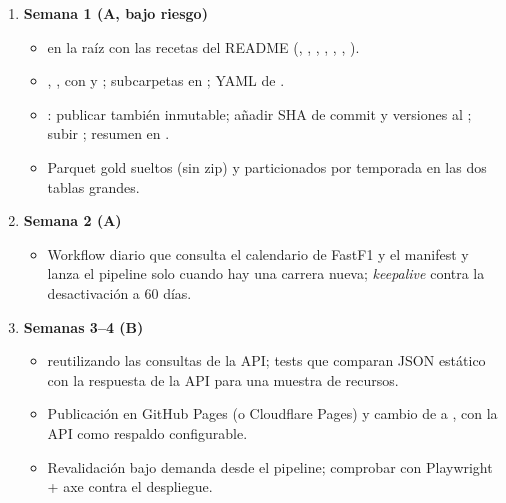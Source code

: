 \begin{enumerate}
\item \textbf{Semana 1 (A, bajo riesgo)}
\begin{itemize}
\item {} en la raíz con las recetas del README (, , , , , , ).
\item {}, ,  con  y ; subcarpetas en ; YAML de .
\item {}: publicar también  inmutable; añadir SHA de commit y versiones al ; subir ; resumen en .
\item Parquet gold sueltos (sin zip) y particionados por temporada en las dos tablas grandes.
\end{itemize}
\item \textbf{Semana 2 (A)}
\begin{itemize}
\item Workflow  diario que consulta el calendario de FastF1 y el manifest y lanza el pipeline solo cuando hay una carrera nueva; \emph{keepalive} contra la desactivación a 60 días.
\end{itemize}
\item \textbf{Semanas 3–4 (B)}
\begin{itemize}
\item {} reutilizando las consultas de la API; tests que comparan JSON estático con la respuesta de la API para una muestra de recursos.
\item Publicación en GitHub Pages (o Cloudflare Pages) y cambio de  a , con la API como respaldo configurable.
\item Revalidación bajo demanda desde el pipeline; comprobar con Playwright + axe contra el despliegue.
\end{itemize}

\end{enumerate}
